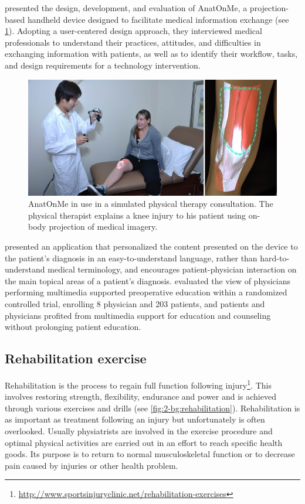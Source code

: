 \citet{Ni2011} presented the design, development, and evaluation of AnatOnMe, a projection-based handheld device designed to facilitate medical information exchange (see \figurename{\ref{fig:2-bg:AnatOnMe-projection-basedhandhelddevice}}). Adopting a user-centered design approach, they interviewed medical professionals to understand their practices, attitudes, and difficulties in exchanging information with patients, as well as to identify their workflow, tasks, and design requirements for a technology intervention.
\begin{figure}
\centering
\includegraphics[width=0.7\linewidth]{"figures/2-bg/AnatOnMe-projection-based handheld device"}
\caption{AnatOnMe in use in a simulated physical therapy consultation. The physical therapist explains a knee injury to his patient using on-body projection of medical imagery.}
\label{fig:2-bg:AnatOnMe-projection-basedhandhelddevice}
\end{figure}

\citet{Gonzales2012} presented an application that personalized the content presented on the device to the patient's diagnosis in an easy-to-understand language, rather than hard-to-understand medical terminology, and encourages patient-physician interaction on the main topical areas of a patient's diagnosis.
\citet{Ihrig2012} evaluated the view of physicians performing multimedia supported preoperative education within a randomized controlled trial, enrolling 8 physician and 203 patients, and patients and physicians profited from multimedia support for education and counseling without prolonging patient education. 


\subsection{Rehabilitation exercise}
Rehabilitation is the process to regain full function following injury\footnote{\url{http://www.sportsinjuryclinic.net/rehabilitation-exercises}}. This involves restoring strength, flexibility, endurance and power and is achieved through various exercises and drills (see \figurename{\ref{fig:2-bg:rehabilitation}}). Rehabilitation is as important as treatment following an injury but unfortunately is often overlooked. Usually physiatrists are involved in the exercise procedure and optimal physical activities are carried out in an effort to reach specific health goods. Its purpose is to return to normal musculoskeletal function or to decrease pain caused by injuries or other health problem. 

